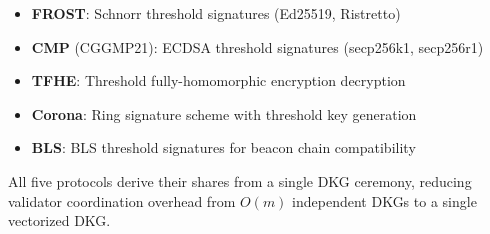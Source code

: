 \begin{itemize}
\item \textbf{FROST}: Schnorr threshold signatures (Ed25519, Ristretto)
\item \textbf{CMP} (CGGMP21): ECDSA threshold signatures (secp256k1, secp256r1)
\item \textbf{TFHE}: Threshold fully-homomorphic encryption decryption
\item \textbf{Corona}: Ring signature scheme with threshold key generation
\item \textbf{BLS}: BLS threshold signatures for beacon chain compatibility
\end{itemize}

All five protocols derive their shares from a single DKG ceremony, reducing validator coordination overhead from $O(m)$ independent DKGs to a single vectorized DKG.

